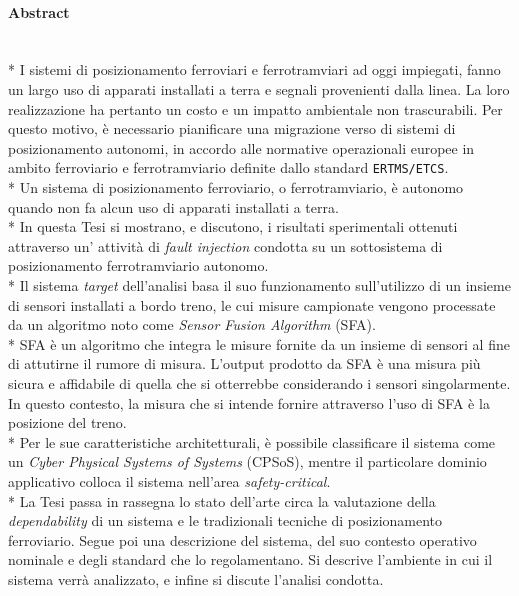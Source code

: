 \paragraph{Abstract}\mbox{}\\*
I sistemi di posizionamento ferroviari e ferrotramviari ad oggi impiegati, fanno un largo uso di apparati installati a terra e segnali provenienti dalla linea. La loro realizzazione ha pertanto un costo e un impatto ambientale non trascurabili. Per questo motivo, \`e necessario pianificare una migrazione verso di sistemi di posizionamento autonomi, in accordo alle normative operazionali europee in ambito ferroviario e ferrotramviario definite dallo standard \texttt{ERTMS/ETCS}.\\*
Un sistema di posizionamento ferroviario, o ferrotramviario, \`e autonomo quando non fa alcun uso di apparati installati a terra.\\*
In questa Tesi si mostrano, e discutono, i risultati sperimentali ottenuti attraverso un' attivit\`a di \emph{fault injection} condotta su un sottosistema di posizionamento ferrotramviario autonomo.\\*
Il sistema \emph{target} dell'analisi basa il suo funzionamento sull'utilizzo di un insieme di sensori installati a bordo treno, le cui misure campionate vengono processate da un algoritmo noto come \emph{Sensor Fusion Algorithm} (SFA).\\*
SFA \`e un algoritmo che integra le misure fornite da un insieme di sensori al fine di attutirne il rumore di misura. L'output prodotto da SFA \`e una misura pi\`u sicura e affidabile di quella che si otterrebbe considerando i sensori singolarmente. In questo contesto, la misura che si intende fornire attraverso l'uso di SFA \`e la posizione del treno.\\*
Per le sue caratteristiche architetturali, \`e possibile classificare il sistema come un \emph{Cyber Physical Systems of Systems} (CPSoS), mentre il particolare dominio applicativo colloca il sistema nell'area \emph{safety-critical}.\\*
La Tesi passa in rassegna lo stato dell'arte circa la valutazione della \emph{dependability} di un sistema e le tradizionali tecniche di posizionamento ferroviario. Segue poi una descrizione del sistema, del suo contesto operativo nominale e degli standard che lo regolamentano. Si descrive l'ambiente in cui il sistema verr\`a analizzato, e infine si discute l'analisi condotta.
